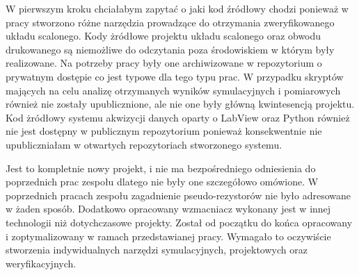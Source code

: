 \begin{frame}[t]
    \begin{block}{\tb}
    \end{block}
    W pierwszym kroku chciałabym zapytać o jaki kod źródłowy chodzi ponieważ w pracy stworzono różne narzędzia prowadzące do otrzymania zweryfikowanego układu scalonego. 
    Kody żródłowe projektu układu scalonego oraz obwodu drukowanego są niemożliwe do odczytania poza środowiskiem w którym były realizowane.
    Na potrzeby pracy były one archiwizowane w repozytorium o prywatnym dostępie co jest typowe dla tego typu prac.
    W przypadku skryptów mających na celu analizę otrzymanych wyników symulacyjnych i pomiarowych również nie zostały upublicznione, ale nie one były główną kwintesencją projektu.
    Kod żródłowy systemu akwizycji danych oparty o LabView oraz Python również nie jest dostępny w publicznym repozytorium ponieważ konsekwentnie nie upubliczniałam w otwartych repozytoriach stworzonego systemu.
    
\end{frame}
\begin{frame}[t]
    \begin{block}{\tb}
    \end{block}

Jest to kompletnie nowy projekt, i nie ma bezpośredniego odniesienia do poprzednich prac zespołu dlatego nie były one szczegółowo omówione.
W poprzednich pracach zespołu zagadnienie pseudo-rezystorów nie było adresowane w żaden sposób.
Dodatkowo opracowany wzmacniacz wykonany jest w innej technologii niż dotychczasowe projekty.
Został od początku do końca opracowany i zoptymalizowany w ramach przedstawianej pracy.
Wymagało to oczywiście stworzenia indywidualnych narzędzi symulacyjnych, projektowych oraz weryfikacyjnych. 

\end{frame}


